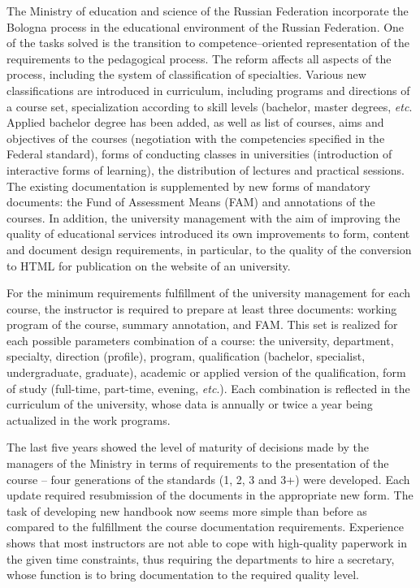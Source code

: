 \documentclass[conference,a4paper]{IEEEtran}
\begin{document}
The Ministry of education and science of the Russian Federation incorporate the Bologna process in the educational environment of the Russian Federation.  One of the tasks solved is the transition to competence--oriented representation of the requirements to the pedagogical process.  The reform affects all aspects of the process, including the system of classification of specialties.  Various new classifications are introduced in curriculum, including programs and directions of a course set, specialization according to skill levels (bachelor, master degrees, \textit{etc}.  Applied bachelor degree has been added, as well as list of courses, aims and objectives of the courses (negotiation with the competencies specified in the Federal standard), forms of conducting classes in universities (introduction of interactive forms of learning), the distribution of lectures and practical sessions.  The existing documentation is supplemented by new forms of mandatory documents: the Fund of Assessment Means (FAM) and annotations of the courses.  In addition, the university management with the aim of improving the quality of educational services introduced its own improvements to form, content and document design requirements, in particular, to the quality of the conversion to HTML for publication on the website of an university.

For the minimum requirements fulfillment of the university management for each course, the instructor is required to prepare at least three documents: working program of the course, summary annotation, and  FAM.  This set is realized for each possible parameters combination of a course: the university, department, specialty, direction (profile), program, qualification (bachelor, specialist, undergraduate, graduate), academic or applied version of the qualification, form of study (full-time, part-time, evening, \emph{etc}.).  Each combination is reflected in the curriculum of the university, whose data is annually or twice a year being actualized in the work programs.

The last five years showed the level of maturity of decisions made by the managers of the Ministry in terms of requirements to the presentation of the course -- four generations of the standards (1, 2, 3 and 3+) were developed.  Each update required resubmission of the documents in the appropriate new form.  The task of developing new handbook now seems more simple than before as compared to the fulfillment the course documentation requirements.  Experience shows that most instructors are not able to cope with high-quality paperwork in the given time constraints, thus requiring the departments to hire a secretary, whose function is to bring documentation to the required quality level.
\end{document}
